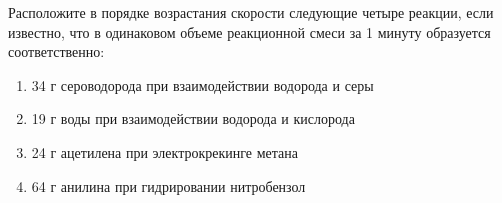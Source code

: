 
Расположите в порядке возрастания скорости следующие четыре реакции, если известно, что в одинаковом объеме реакционной смеси за 1 минуту образуется соответственно:

\begin{enumerate}
    \item 34 г сероводорода при взаимодействии водорода и серы
    \item 19 г воды при взаимодействии водорода и кислорода
    \item 24 г ацетилена при электрокрекинге метана
    \item 64 г анилина при гидрировании нитробензол
\end{enumerate}

